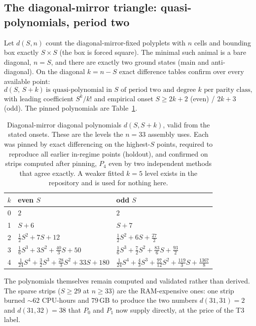 \documentclass[11pt]{article}
\newcommand{\tierthree}{\textsf{T3}}
\begin{document}
\subsection{The diagonal-mirror triangle: quasi-polynomials, period two}
\label{sec:dmdiag}

Let $d(S,n)$ count the diagonal-mirror-fixed polyplets with $n$ cells and
bounding box exactly $S\times S$ (the box is forced square). The minimal such
animal is a bare diagonal, $n=S$, and there are exactly two ground states
(main and anti-diagonal). On the diagonal $k=n-S$ exact
difference tables confirm over every available point:
\[
  d(S,\,S+k)\ \text{is quasi-polynomial in } S \text{ of period two and
  degree } k \text{ per parity class},
\]
with leading coefficient $S^k/k!$ and empirical onset $S\ge 2k+2$ (even) /
$2k+3$ (odd). The pinned polynomials are Table~\ref{tab:dmpk}.

\begin{table}[H]
  \centering\small
  \renewcommand{\arraystretch}{1.5}
  \begin{tabular}{c l l}
    \toprule
    $k$ & even $S$ & odd $S$\\
    \midrule
    0 & $2$ & $2$\\
    1 & $S+6$ & $S+7$\\
    2 & $\tfrac12S^2+7S+12$ & $\tfrac12S^2+6S+\tfrac{27}{2}$\\
    3 & $\tfrac16S^3+3S^2+\tfrac{40}{3}S+50$ &
        $\tfrac16S^3+\tfrac72S^2+\tfrac{83}{6}S+\tfrac{93}{2}$\\
    4 & $\tfrac1{24}S^4+\tfrac32S^3+\tfrac{28}{3}S^2+33S+180$ &
        $\tfrac1{24}S^4+\tfrac43S^3+\tfrac{97}{12}S^2+\tfrac{119}{3}S+\tfrac{1367}{8}$\\
    \bottomrule
  \end{tabular}
  \caption{Diagonal-mirror diagonal polynomials $d(S,S+k)$, valid from the
  stated onsets. These are the levels the $n=33$ assembly uses. Each was
  pinned by exact differencing on the highest-$S$ points, required to
  reproduce all earlier in-regime points (holdout), and confirmed on strips
  computed after pinning, $P_4$ even by two independent methods that agree
  exactly. A weaker fitted $k=5$ level exists in the repository and is used
  for nothing here.}
  \label{tab:dmpk}
\end{table}

The polynomials themselves remain computed and validated rather than
derived. The sparse strips ($S\ge29$ at
$n\ge33$) are the RAM-expensive ones: one strip burned
${\sim}62$ CPU-hours and $79$\,GB to produce the two numbers $d(31,31)=2$
and $d(31,32)=38$ that $P_0$ and $P_1$ now supply directly, at the price of
the \tierthree{} label.
\end{document}
